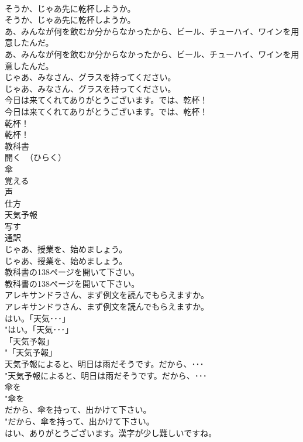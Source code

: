 \documentclass[8pt]{extreport}
\begin{document}
\begin{CJK}{UTF8}{min}
\\	そうか、じゃあ先に乾杯しようか。	
\\	そうか、じゃあ先に乾杯しようか。 
\\	あ、みんなが何を飲むか分からなかったから、ビール、チューハイ、ワインを用意したんだ。	
\\	あ、みんなが何を飲むか分からなかったから、ビール、チューハイ、ワインを用意したんだ。 
\\	じゃあ、みなさん、グラスを持ってください。	
\\	じゃあ、みなさん、グラスを持ってください。 
\\	今日は来てくれてありがとうございます。では、乾杯！	
\\	今日は来てくれてありがとうございます。では、乾杯！ 
\\	乾杯！	
\\	乾杯！ 
\\	教科書
\\	開く　（ひらく）
\\	傘
\\	覚える
\\	声
\\	仕方
\\	天気予報
\\	写す
\\	通訳
\\	じゃあ、授業を、始めましょう。	
\\	じゃあ、授業を、始めましょう。 
\\	教科書の138ページを開いて下さい。	
\\	教科書の138ページを開いて下さい。 
\\	アレキサンドラさん、まず例文を読んでもらえますか。	
\\	アレキサンドラさん、まず例文を読んでもらえますか。 
\\	はい。「天気･･･」	
\\	"はい。「天気･･･」 
\\	「天気予報」	
\\	"「天気予報」 
\\	天気予報によると、明日は雨だそうです。だから、･･･	
\\	"天気予報によると、明日は雨だそうです。だから、･･･ 
\\	傘を	
\\	"傘を 
\\	だから、傘を持って、出かけて下さい。	
\\	"だから、傘を持って、出かけて下さい。 
\\	はい、ありがとうございます。漢字が少し難しいですね。	

\end{CJK}
\end{document}
